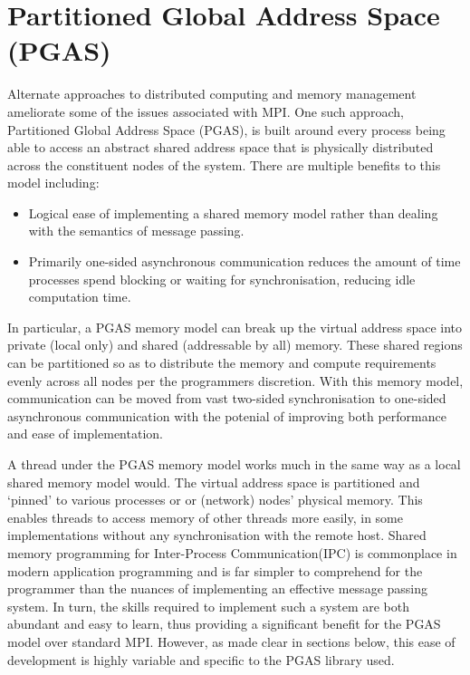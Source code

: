 \section{Partitioned Global Address Space (PGAS)}
Alternate approaches to distributed computing and memory management ameliorate some of the issues associated with MPI. One such approach, Partitioned Global Address Space (PGAS), is built around every process being able to access an abstract shared address space that is physically distributed across the constituent nodes of the system. There are multiple benefits to this model including:
\begin{itemize}
    \item Logical ease of implementing a shared memory model rather than dealing with the semantics of message passing.
    \item Primarily one-sided asynchronous communication reduces the amount of time processes spend blocking or waiting for synchronisation, reducing idle computation time. 
\end{itemize}

In particular, a PGAS memory model can break up the virtual address space into private (local only) and shared (addressable by all) memory. These shared regions can be partitioned so as to distribute the memory and compute requirements evenly across all nodes per the programmers discretion. With this memory model, communication can be moved from vast two-sided synchronisation to one-sided asynchronous communication with the potenial of improving both performance and ease of implementation. 

A thread under the PGAS memory model works much in the same way as a local shared memory model would. The virtual address space is partitioned and `pinned' to various processes or or (network) nodes' physical memory. This enables threads to access memory of other threads more easily, in some implementations without any
synchronisation with the remote host. Shared memory programming for Inter-Process Communication(IPC) is commonplace in modern application programming and is far simpler to comprehend for the programmer than the nuances of implementing an effective message passing system. In turn, the skills required to implement such a system are both abundant and easy to learn, thus providing a significant benefit for the PGAS model over standard MPI. 
However, as made clear in sections below, this ease of development is highly variable and specific to the PGAS library used.

